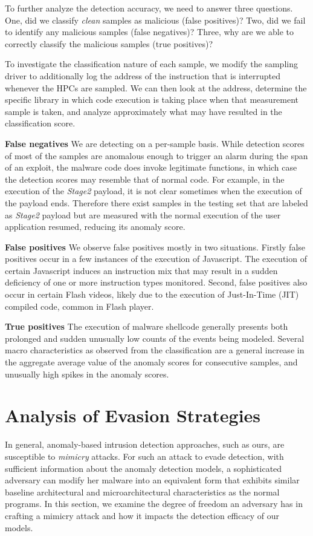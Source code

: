 \documentclass{acm_proc_article-sp}
\begin{document}
	To further analyze the detection accuracy, we need to answer three questions. One, did we classify \textit{clean} samples as malicious (false positives)? Two, did we fail to identify any malicious samples (false negatives)? Three, why are we able to correctly classify the malicious samples (true positives)?
	
	To investigate the classification nature of each sample, we modify the sampling driver to additionally log the address of the instruction that is interrupted whenever the HPCs are sampled. We can then look at the address, determine the specific library in which code execution is taking place when that measurement sample is taken, and analyze approximately what may have resulted in the classification score.
	
	\textbf{False negatives} \space\space We are detecting on a per-sample basis. While detection scores of most of the samples are anomalous enough to trigger an alarm during the span of an exploit, the malware code does invoke legitimate functions, in which case the detection scores may resemble that of normal code. For example, in the execution of the \textit{Stage2} payload, it is not clear sometimes when the execution of the payload ends. Therefore there exist samples in the testing set that are labeled as \textit{Stage2} payload but are measured with the normal execution of the user application resumed, reducing its anomaly score.
	
	\textbf{False positives} \space\space We observe false positives mostly in two situations. Firstly false positives occur in a few instances of the execution of Javascript. The execution of certain Javascript induces an instruction mix that may result in a sudden deficiency of one or more instruction types monitored. Second, false positives also occur in certain Flash videos, likely due to the execution of Just-In-Time (JIT) compiled code, common in Flash player.
	
	\textbf{True positives} \space\space The execution of malware shellcode generally presents both prolonged and sudden unusually low counts of the events being modeled. Several macro characteristics as observed from the classification are a general increase in the aggregate average value of the anomaly scores for consecutive samples, and unusually high spikes in the anomaly scores.
	
	\fi 




\section{Analysis of Evasion Strategies}
\label{sec:evasion}
In general, anomaly-based intrusion detection approaches, such as ours, 
are susceptible to \textit{mimicry} attacks. For such an attack to evade 
detection, with sufficient information about the anomaly detection models, 
a sophisticated adversary can modify her malware into an equivalent form
that exhibits similar baseline architectural and microarchitectural 
characteristics as the normal programs. In this section, we examine the degree 
of freedom an adversary has in crafting a mimicry attack and how it impacts the 
detection efficacy of our models. 
\end{document}
